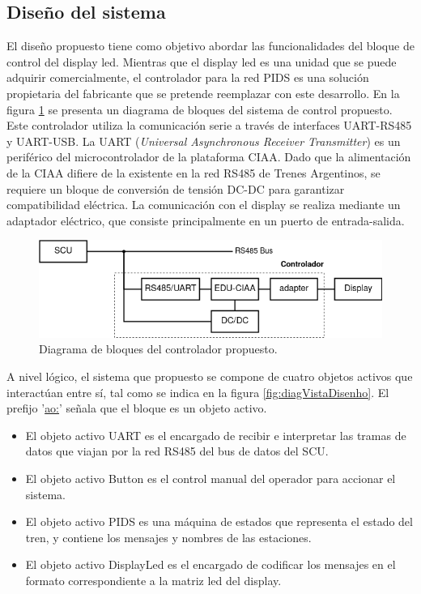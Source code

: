 \subsection{Diseño del sistema}

El diseño propuesto tiene como objetivo abordar las funcionalidades del bloque de control del display led. Mientras que el display led es una unidad que se puede adquirir comercialmente, el controlador para la red PIDS es una solución propietaria del fabricante que se pretende reemplazar con este desarrollo. En la figura \ref{fig:diagVistaReDisenhoEduCIAA} se presenta un diagrama de bloques del sistema de control propuesto. Este controlador utiliza la comunicación serie a través de interfaces UART-RS485 y UART-USB. La UART (\textit{Universal Asynchronous Receiver Transmitter}) es un periférico del microcontrolador de la plataforma CIAA. Dado que la alimentación de la CIAA difiere de la existente en la red RS485 de Trenes Argentinos, se requiere un bloque de conversión de tensión DC-DC para garantizar compatibilidad eléctrica. La comunicación con el display se realiza mediante un adaptador eléctrico, que consiste principalmente en un puerto de entrada-salida.\\


\begin{figure}[ht]
	\centering
	\includegraphics[width=1\textwidth]{./Figures/diagVistaReDisenhoEduCIAA.png}
	\caption{Diagrama de bloques del controlador propuesto.}
	\label{fig:diagVistaReDisenhoEduCIAA}
\end{figure}

A nivel lógico, el sistema que propuesto se compone de cuatro objetos activos que interactúan entre sí, tal como se indica en la figura \ref{fig:diagVistaDisenho}. El prefijo '\underline{ao:}' señala que el bloque es un objeto activo. 
\begin{itemize}
\item El objeto activo UART es el encargado de recibir e interpretar las tramas de datos que viajan por la red RS485 del bus de datos del SCU. 
\item El objeto activo Button es el control manual del operador para accionar el sistema. 
\item El objeto activo PIDS es una máquina de estados que representa el estado del tren, y contiene los mensajes y nombres de las estaciones. 
\item El objeto activo DisplayLed es el encargado de codificar los mensajes en el formato correspondiente a la matriz led del display.\\
\end{itemize}

